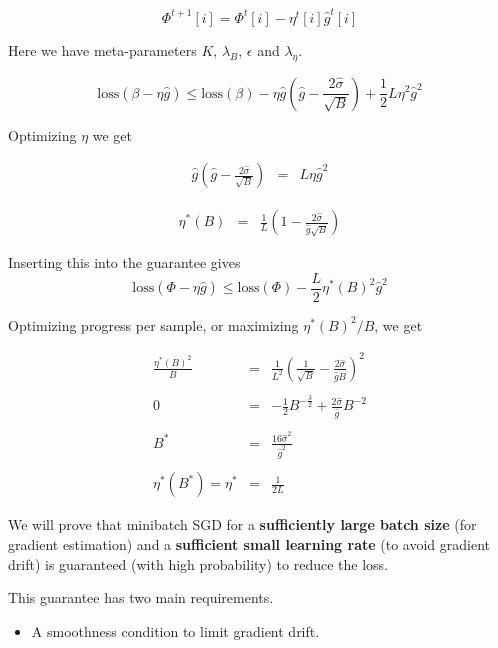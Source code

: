 {{\vfill
$$\Phi^{t+1}[i] = \Phi^t[i] - \eta^t[i] \hat{g}^t[i]$$

\vfill
Here we have meta-parameters $K$, $\lambda_B$, $\epsilon$ and $\lambda_\eta$.


$$\mathrm{loss}(\beta - \eta\hat{g}) \leq \mathrm{loss}(\beta) - \eta \hat{g}\left(\hat{g} - \frac{2\hat{\sigma}}{\sqrt{B}} \right)  + \frac{1}{2}L \eta^2 \hat{g}^2$$

Optimizing $\eta$ we get

\begin{eqnarray*}
 \hat{g}\left(\hat{g} - \frac{2\hat{\sigma}}{\sqrt{B}} \right) & = & L \eta \hat{g}^2
\end{eqnarray*}


\begin{eqnarray*}
\eta^*(B) & = & \frac{1}{L}\left(1 - \frac{2\hat{\sigma}}{\hat{g}\sqrt{B}}\right)
\end{eqnarray*}

\vfill
Inserting this into the guarantee gives
$$\mathrm{loss}(\Phi - \eta \hat{g}) \leq \mathrm{loss}(\Phi) - \frac{L}{2}\eta^*(B)^2\hat{g}^2$$


Optimizing progress per sample, or maximizing $\eta^*(B)^2/B$, we get

\begin{eqnarray*}
\frac{\eta^*(B)^2}{B} & = & \frac{1}{L^2}\left(\frac{1}{\sqrt{B}} - \frac{2\hat{\sigma}}{\hat{g}B}\right)^2 \\
\\
0 & = &  - \frac{1}{2} B^{-\frac{3}{2}} + \frac{2\hat{\sigma}}{\hat{g}} B^{-2} \nonumber \\
\\
B^* & = & \frac{16\hat{\sigma}^2}{\hat{g}^2} \\
\\
\eta^*(B^*) = \eta^*  & = & \frac{1}{2L}
\end{eqnarray*}


We will prove that minibatch SGD for a {\bf sufficiently large batch size} (for gradient estimation) and a {\bf sufficient small learning rate} (to avoid gradient drift)
is guaranteed (with high probability) to reduce the loss.

\vfill
This guarantee has two main requirements.

\vfill
\begin{itemize}
\item A smoothness condition to limit gradient drift.


\end{itemize}}}
